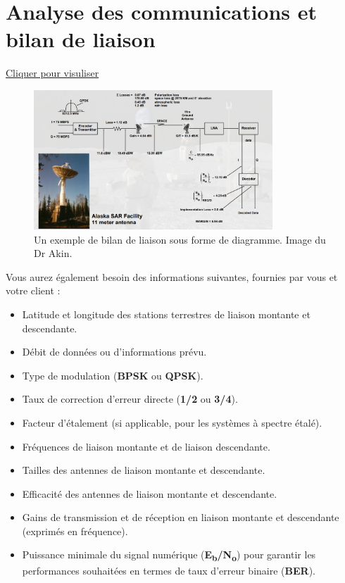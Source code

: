 \section{Analyse des communications et bilan de liaison}
\href{https://youtu.be/qFMQgfgPAvg}{Cliquer pour visuliser}
\begin{figure}[H]
    \centering
    \includegraphics[width=0.8\textwidth]{figures/6-90.jpg}
    \caption{Un exemple de bilan de liaison sous forme de diagramme. Image du Dr Akin.}
    \label{fig:communication7}
\end{figure}

\noindent Vous aurez également besoin des informations suivantes, fournies par vous et votre client :

\begin{itemize}
    \item Latitude et longitude des stations terrestres de liaison montante et descendante.
    \item Débit de données ou d'informations prévu.
    \item Type de modulation (\textbf{BPSK} ou \textbf{QPSK}).
    \item Taux de correction d'erreur directe (\textbf{1/2} ou \textbf{3/4}).
    \item Facteur d'étalement (si applicable, pour les systèmes à spectre étalé).
    \item Fréquences de liaison montante et de liaison descendante.
    \item Tailles des antennes de liaison montante et descendante.
    \item Efficacité des antennes de liaison montante et descendante.
    \item Gains de transmission et de réception en liaison montante et descendante (exprimés en fréquence).
    \item Puissance minimale du signal numérique (\textbf{E\textsubscript{b}/N\textsubscript{o}}) pour garantir les performances souhaitées en termes de taux d'erreur binaire (\textbf{BER}).
\end{itemize}


